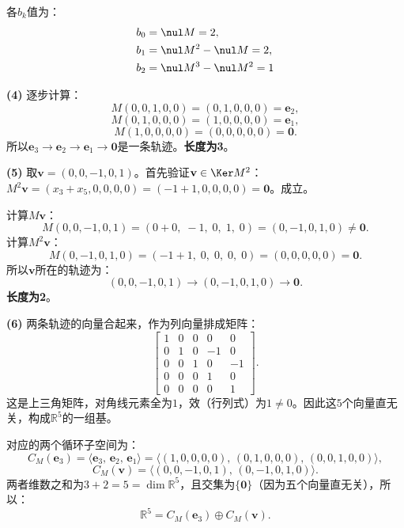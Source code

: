 \documentclass[12pt,UTF8,fontset=none]{ctexbook}
\begin{document}
\begin{so}
各$b_k$值为：
\begin{align*}
    b_0 &= \nul M = 2, \\
    b_1 &= \nul M^2 - \nul M = 2, \\
    b_2 &= \nul M^3 - \nul M^2 = 1
\end{align*}

\textbf{(4)} 逐步计算：
$$M(0,0,1,0,0) = (0,1,0,0,0) = \mathbf{e}_2,$$
$$M(0,1,0,0,0) = (1,0,0,0,0) = \mathbf{e}_1,$$
$$M(1,0,0,0,0) = (0,0,0,0,0) = \mathbf{0}.$$
所以$\mathbf{e}_3 \to \mathbf{e}_2 \to \mathbf{e}_1 \to \mathbf{0}$是一条轨迹。\textbf{长度为3}。

\textbf{(5)} 取$\mathbf{v} = (0,0,-1,0,1)$。首先验证$\mathbf{v} \in \Ker M^2$：
$M^2\mathbf{v} = (x_3+x_5, 0, 0, 0, 0) = (-1+1, 0, 0, 0, 0) = \mathbf{0}$。成立。

计算$M\mathbf{v}$：
$$M(0,0,-1,0,1) = (0+0,\; -1,\; 0,\; 1,\; 0) = (0,-1,0,1,0) \neq \mathbf{0}.$$
计算$M^2\mathbf{v}$：
$$M(0,-1,0,1,0) = (-1+1,\; 0,\; 0,\; 0,\; 0) = (0,0,0,0,0) = \mathbf{0}.$$
所以$\mathbf{v}$所在的轨迹为：
$$(0,0,-1,0,1) \longrightarrow (0,-1,0,1,0) \longrightarrow \mathbf{0}.$$
\textbf{长度为2}。

\textbf{(6)} 两条轨迹的向量合起来，作为列向量排成矩阵：
$$\begin{bmatrix} 1 & 0 & 0 & 0 & 0 \\ 0 & 1 & 0 & -1 & 0 \\ 0 & 0 & 1 & 0 & -1 \\ 0 & 0 & 0 & 1 & 0 \\ 0 & 0 & 0 & 0 & 1 \end{bmatrix}.$$
这是上三角矩阵，对角线元素全为$1$，效（行列式）为$1 \neq 0$。因此这$5$个向量直无关，构成$\mathbb{R}^5$的一组基。

对应的两个循环子空间为：
$$C_M(\mathbf{e}_3) = \langle \mathbf{e}_3,\, \mathbf{e}_2,\, \mathbf{e}_1 \rangle = \langle (1,0,0,0,0),\, (0,1,0,0,0),\, (0,0,1,0,0)\rangle,$$
$$C_M(\mathbf{v}) = \langle (0,0,-1,0,1),\, (0,-1,0,1,0)\rangle.$$
两者维数之和为$3+2=5=\dim\mathbb{R}^5$，且交集为$\{\mathbf{0}\}$（因为五个向量直无关），所以：
$$\mathbb{R}^5 = C_M(\mathbf{e}_3) \oplus C_M(\mathbf{v}).$$
\end{so}


\end{document}
